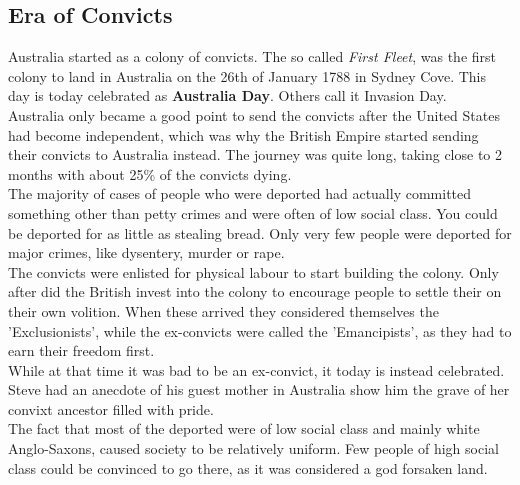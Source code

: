 \documentclass{article}
\begin{document}
	\subsection{Era of Convicts}
	Australia started as a colony of convicts. The so called \textit{First Fleet}, was the first colony to land in Australia on the 26th of January 1788 in Sydney Cove. This day is today celebrated as \textbf{Australia Day}. Others call it Invasion Day.\\
	Australia only became a good point to send the convicts after the United States had become independent, which was why the British Empire started sending their convicts to Australia instead. The journey was quite long, taking close to 2 months with about 25\% of the convicts dying. \\
	The majority of cases of people who were deported had actually committed something other than petty crimes and were often of low social class. You could be deported for as little as stealing bread. Only very few people were deported for major crimes, like dysentery, murder or rape. \\
	The convicts were enlisted for physical labour to start building the colony. Only after did the British invest into the colony to encourage people to settle their on their own volition. When these arrived they considered themselves the 'Exclusionists', while the ex-convicts were called the 'Emancipists', as they had to earn their freedom first. \\
	While at that time it was bad to be an ex-convict, it today is instead celebrated. Steve had an anecdote of his guest mother in Australia show him the grave of her convixt ancestor filled with pride. \\
	The fact that most of the deported were of low social class and mainly white Anglo-Saxons, caused society to be relatively uniform. Few people of high social class could be convinced to go there, as it was considered a god forsaken land. \\
\end{document}
